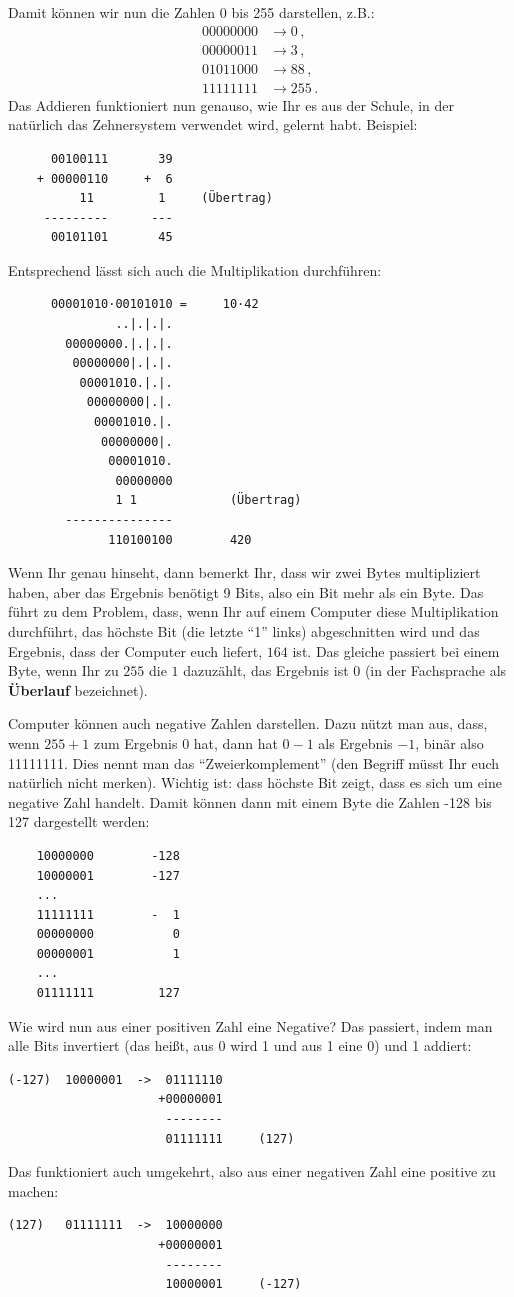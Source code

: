 \noindent
Damit können wir nun die Zahlen 0 bis 255 darstellen, z.B.:
\begin{align*}
  00000000 &\rightarrow 0\,, \\
  00000011 &\rightarrow 3\,, \\
  01011000 &\rightarrow 88\,, \\
  11111111 &\rightarrow 255\,.
\end{align*}
Das Addieren funktioniert nun genauso, wie Ihr es aus der Schule, in der natürlich das Zehnersystem verwendet wird, gelernt habt. Beispiel:
\begin{lstlisting}
      00100111       39
    + 00000110     +  6
          11         1     (Übertrag)
     ---------      ---
      00101101       45
\end{lstlisting}
Entsprechend lässt sich auch die Multiplikation durchführen:
\begin{lstlisting}
      00001010·00101010 =     10·42
               ..|.|.|.
        00000000.|.|.|.
         00000000|.|.|.
          00001010.|.|.
           00000000|.|.
            00001010.|.
             00000000|.
              00001010.
               00000000
               1 1             (Übertrag)
        ---------------
              110100100        420
\end{lstlisting}
Wenn Ihr genau hinseht, dann bemerkt Ihr, dass wir zwei Bytes multipliziert haben, aber das Ergebnis benötigt 9 Bits, also ein Bit mehr als ein Byte. Das führt zu dem Problem, dass, wenn Ihr auf einem Computer diese Multiplikation durchführt, das höchste Bit (die letzte ``1'' links) abgeschnitten wird und das Ergebnis, dass der Computer euch liefert, $164$ ist. Das gleiche passiert bei einem Byte, wenn Ihr zu $255$ die $1$ dazuzählt, das Ergebnis ist $0$ (in der Fachsprache als \textbf{Überlauf} bezeichnet).

Computer können auch negative Zahlen darstellen. Dazu nützt man aus, dass, wenn $255 + 1$ zum Ergebnis $0$ hat, dann hat $0-1$ als Ergebnis $-1$, binär also 11111111. Dies nennt man das ``Zweierkomplement'' (den Begriff müsst Ihr euch natürlich nicht merken). Wichtig ist: dass höchste Bit zeigt, dass es sich um eine negative Zahl handelt. Damit können dann mit einem Byte die Zahlen -128 bis 127 dargestellt werden:
\begin{lstlisting}
    10000000        -128
    10000001        -127
    ...
    11111111        -  1
    00000000           0
    00000001           1
    ...
    01111111         127
\end{lstlisting}
Wie wird nun aus einer positiven Zahl eine Negative? Das passiert, indem man alle Bits invertiert (das heißt, aus 0 wird 1 und aus 1 eine 0) und 1 addiert:
\begin{lstlisting}
(-127)  10000001  ->  01111110
                     +00000001
                      --------
                      01111111     (127)
\end{lstlisting}
Das funktioniert auch umgekehrt, also aus einer negativen Zahl eine positive zu machen:
\begin{lstlisting}
(127)   01111111  ->  10000000
                     +00000001
                      --------
                      10000001     (-127)
\end{lstlisting}

